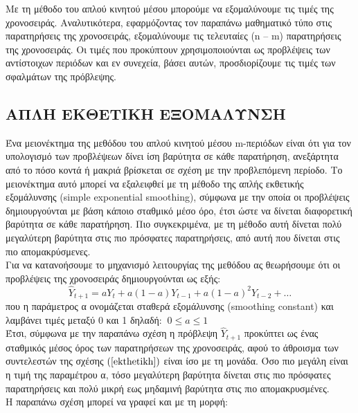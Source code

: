 Με τη μέθοδο του απλού κινητού μέσου μπορούμε να εξομαλύνουμε τις τιμές
της χρονοσειράς. Αναλυτικότερα, εφαρμόζοντας τον παραπάνω μαθηματικό τύπο  στις παρατηρήσεις της χρονοσειράς, εξομαλύνουμε
τις τελευταίες (n – m) παρατηρήσεις της χρονοσειράς. Οι τιμές που
προκύπτουν χρησιμοποιούνται ως προβλέψεις των αντίστοιχων περιόδων και
εν συνεχεία, βάσει αυτών, προσδιορίζουμε τις τιμές των σφαλμάτων της
πρόβλεψης.\\

\subsection{ΑΠΛΗ ΕΚΘΕΤΙΚΗ ΕΞΟΜΑΛΥΝΣΗ}
Ένα μειονέκτημα της μεθόδου του απλού κινητού μέσου m-περιόδων είναι ότι για
τον υπολογισμό των προβλέψεων δίνει ίση βαρύτητα σε κάθε παρατήρηση,
ανεξάρτητα από το πόσο κοντά ή μακριά βρίσκεται σε σχέση με την προβλεπόμενη περίοδο. Το μειονέκτημα αυτό μπορεί να εξαλειφθεί με τη μέθοδο της απλής εκθετικής εξομάλυνσης (simple exponential smoothing), σύμφωνα με την οποία οι προβλέψεις δημιουργούνται με βάση κάποιο σταθμικό μέσο όρο, έτσι ώστε να δίνεται
διαφορετική βαρύτητα σε κάθε παρατήρηση. Πιο συγκεκριμένα, με τη μέθοδο αυτή
δίνεται πολύ μεγαλύτερη βαρύτητα στις πιο πρόσφατες παρατηρήσεις, από αυτή που
δίνεται στις πιο απομακρύσμενες.\\
Για να κατανοήσουμε το μηχανισμό λειτουργίας της μεθόδου ας θεωρήσουμε ότι
οι προβλέψεις της χρονοσειράς δημιουργούνται ως εξής:\\
\begin{equation}
\label{ekthetikh}
 \widehat{Y}_{t + 1} = aY_t + a \left( 1 − a \right) Y_{t − 1} + a \left( 1 − a \right)^2 Y_{t − 2} + \dots 
\end{equation}
που η παράμετρος α ονομάζεται σταθερά εξομάλυνσης (smoothing constant) και
λαμβάνει τιμές μεταξύ 0 και 1 δηλαδή: $ \: 0\leq a\leq 1$\\
Έτσι, σύμφωνα με την παραπάνω σχέση η πρόβλεψη $\widehat{Y}_{t+1} $ προκύπτει ως ένας
σταθμικός μέσος όρος των παρατηρήσεων της χρονοσειράς, αφού το άθροισμα των
συντελεστών της σχέσης $\left(\ref{ekthetikh}\right) $ είναι ίσο με τη μονάδα. Όσο πιο μεγάλη είναι η τιμή της
παραμέτρου α, τόσο μεγαλύτερη βαρύτητα δίνεται στις πιο πρόσφατες παρατηρήσεις
και πολύ μικρή εως μηδαμινή βαρύτητα στις πιο απομακρυσμένες.\\
Η παραπάνω σχέση μπορεί να γραφεί και με τη μορφή:\\
